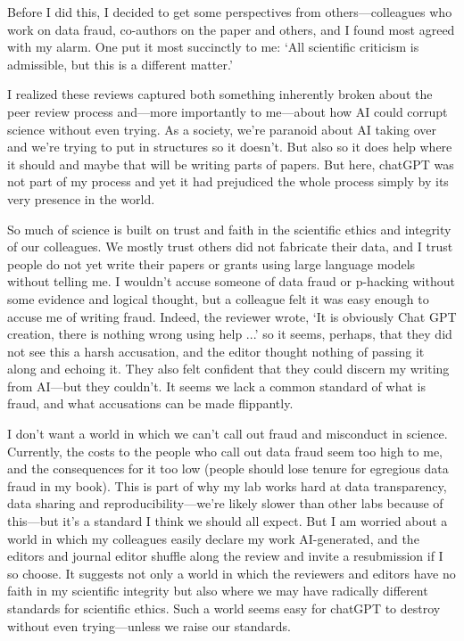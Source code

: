 \documentclass[11pt]{article}
\begin{document}
Before I did this, I decided to get some perspectives from others---colleagues who work on data fraud, co-authors on the paper and others, and I found most agreed with my alarm. One put it most succinctly to me: `All scientific criticism is admissible, but this is a different matter.' 

I realized these reviews captured both something inherently broken about the peer review process and---more importantly to me---about how AI could corrupt science without even trying. As a society, we're paranoid about AI taking over and we're trying to put in structures so it doesn't. But also so it does help where it should and maybe that will be writing parts of papers. But here, chatGPT was not part of my process and yet it had prejudiced the whole process simply by its very presence in the world. 

So much of science is built on trust and faith in the scientific ethics and integrity of our colleagues. We mostly trust others did not fabricate their data, and I trust people do not yet write their papers or grants using large language models without telling me. I wouldn't accuse someone of data fraud or p-hacking without some evidence and logical thought, but a colleague felt it was easy enough to accuse me of writing fraud. Indeed, the reviewer wrote, `It is obviously Chat GPT creation, there is nothing wrong using help ...' so it seems, perhaps, that they did not see this a harsh accusation, and the editor thought nothing of passing it along and echoing it. They also felt confident that they could discern my writing from AI---but they couldn't. It seems we lack a common standard of what is fraud, and what accusations can be made flippantly.

I don't want a world in which we can't call out fraud and misconduct in science. Currently, the costs to the people who call out data fraud seem too high to me, and the consequences for it too low (people should lose tenure for egregious data fraud in my book). This is part of why my lab works hard at data transparency, data sharing and reproducibility---we're likely slower than other labs because of this---but it's a standard I think we should all expect. But I am worried about a world in which my colleagues easily declare my work AI-generated, and the editors and journal editor shuffle along the review and invite a resubmission if I so choose. It suggests not only a world in which the reviewers and editors have no faith in my scientific integrity but also where we may have radically different standards for scientific ethics. Such a world seems easy for chatGPT to destroy without even trying---unless we raise our standards. 
\end{document}
